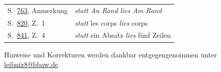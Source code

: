 \begin{longtable}{p{36mm}p{92mm}}
S.~\href{\LSBviiiURL LSB_VIII_3.pdf#page=797}{763}, Anmerkung 	& 			%
\textit{statt} \textit{An Rand}
\textit{lies} \textit{Am Rand} \\

S.~\href{\LSBviiiURL LSB_VIII_3.pdf#page=854}{820}, Z.~1 	&				%
\textit{statt} les corps
\textit{lies} corps \\

S.~\href{\LSBviiiURL LSB_VIII_3.pdf#page=875}{841}, Z.~4 	&	%
\textit{statt} ein Absatz
\textit{lies} fünf Zeilen \\



\end{longtable}



\vfill					%
\noindent
Hinweise und Korrekturen werden dankbar entgegengenommen unter
\href{mailto:leibniz8@bbaw.de}{leibniz8@bbaw.de}
\vspace*{3\baselineskip}	%
